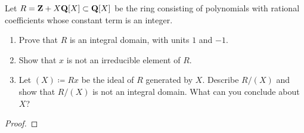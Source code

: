 \begin{problem}
Let $R=\mathbf{Z}+X\mathbf{Q}[X]\subset\mathbf{Q}[X]$ be the ring consisting of polynomials
with rational coefficients whose constant term is an integer.
\begin{enumerate}[label=(\alph*)]
\item Prove that $R$ is an integral domain, with units $1$ and $-1$.
\item Show that $x$ is not an irreducible element of $R$.
\item Let $(X)\coloneqq Rx$ be the ideal of $R$ generated by $X$. Describe
  $R/(X)$ and show that $R/(X)$ is not an integral domain. What can you
  conclude about $X$?
\end{enumerate}
\end{problem}
\begin{proof}
\end{proof}

